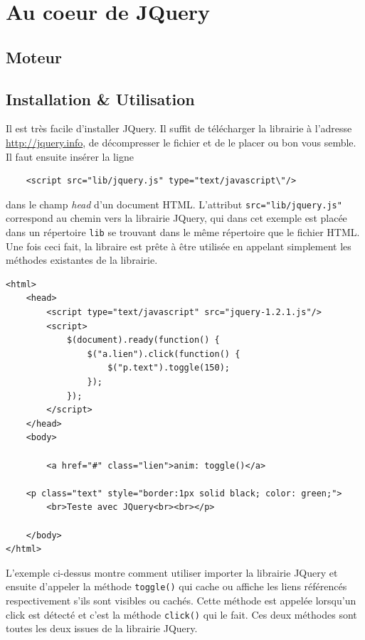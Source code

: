 \documentclass[10pt,a4paper,titlepage]{article}
\begin{document}
\newpage
\renewcommand{\labelitemi}{$\bullet$}
\section{Au coeur de JQuery}
\subsection{Moteur}

\subsection{Installation \& Utilisation}\label{install}
Il est très facile d'installer JQuery. Il suffit de télécharger la librairie à l'adresse \url{http://jquery.info}, de décompresser le fichier et de le placer ou bon vous semble. Il faut ensuite insérer la ligne
\begin{lstlisting}
	<script src="lib/jquery.js" type="text/javascript\"/>
\end{lstlisting}
dans le champ \emph{head} d'un document HTML. L'attribut \texttt{src="lib/jquery.js"} correspond au chemin vers la librairie JQuery, qui dans cet exemple est placée dans un répertoire \texttt{lib} se trouvant dans le même répertoire que le fichier HTML.\\

Une fois ceci fait, la libraire est prête à être utilisée en appelant simplement les méthodes existantes de la librairie.

\begin{lstlisting}
<html>
	<head>
		<script type="text/javascript" src="jquery-1.2.1.js"/>
		<script>
			$(document).ready(function() {		
				$("a.lien").click(function() {
					$("p.text").toggle(150);
				});
			});
		</script>
	</head>
	<body>

		<a href="#" class="lien">anim: toggle()</a>

	<p class="text" style="border:1px solid black; color: green;">
		<br>Teste avec JQuery<br><br></p>
		
	</body>
</html>
\end{lstlisting}

L'exemple ci-dessus montre comment utiliser importer la librairie JQuery et ensuite d'appeler la méthode \texttt{toggle()} qui cache ou affiche les liens référencés respectivement s'ils sont visibles ou cachés. Cette méthode est appelée lorsqu'un click est détecté et c'est la méthode \texttt{click()} qui le fait. Ces deux méthodes sont toutes les deux issues de la librairie JQuery.
\end{document}
